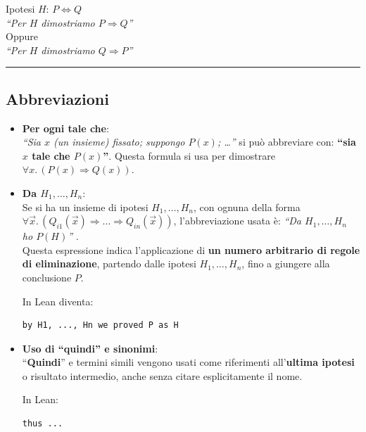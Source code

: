 \documentclass[
  a4paper,
]{article}
\begin{document}
\begin{examplebox}[Esempio]

Ipotesi \(H\): \(P \iff Q\)\\
\emph{``Per \(H\) dimostriamo \(P \Rightarrow Q\)''}\\
Oppure\\
\emph{``Per \(H\) dimostriamo \(Q \Rightarrow P\)''}

\end{examplebox}

\par\noindent\rule{\linewidth}{0.4pt}\par\vspace{6pt}

\hypertarget{abbreviazioni}{%
\subsection{Abbreviazioni}\label{abbreviazioni}}

\begin{itemize}
\item
  \textbf{Per ogni tale che}:\\
  \emph{``Sia \(x\) (un insieme) fissato; suppongo \(P(x)\); \ldots{}''}
  si può abbreviare con: \textbf{``sia \(x\) tale che \(P(x)\)''}.
  Questa formula si usa per dimostrare
  \(\forall x.\,(P(x) \Rightarrow Q(x))\).
\item
  \textbf{Da \(H_1, \dots, H_n\)}:\\
  Se si ha un insieme di ipotesi \(H_1,\dots,H_n\), con ognuna della
  forma
  \(\forall\vec x.\,(Q_{i1}(\vec x) \Rightarrow \dots \Rightarrow Q_{in}(\vec x))\),
  l'abbreviazione usata è: \emph{``Da \(H_1,\dots,H_n\) ho \(P(H)\)''}
  .\\
  Questa espressione indica l'applicazione di \textbf{un numero
  arbitrario di regole di eliminazione}, partendo dalle ipotesi
  \(H_1,\dots,H_n\), fino a giungere alla conclusione \(P\).

  In Lean diventa:

\begin{lstlisting}
by H1, ..., Hn we proved P as H
\end{lstlisting}
\item
  \textbf{Uso di ``quindi'' e sinonimi}:\\
  ``\textbf{Quindi}'' e termini simili vengono usati come riferimenti
  all'\textbf{ultima ipotesi} o risultato intermedio, anche senza citare
  esplicitamente il nome.

  In Lean:

\begin{lstlisting}
thus ...
\end{lstlisting}
\end{itemize}
\end{document}
